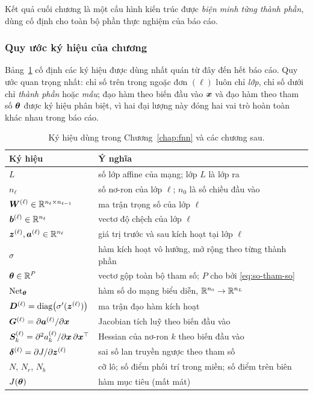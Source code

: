 Kết quả cuối chương là một cấu hình kiến trúc được \emph{biện minh từng thành
phần}, dùng cố định cho toàn bộ phần thực nghiệm của báo cáo.
 
\subsubsection*{Quy ước ký hiệu của chương}
 
Bảng~\ref{tab:ky-hieu} cố định các ký hiệu được dùng nhất quán từ đây đến hết
báo cáo. Quy ước quan trọng nhất: chỉ số trên trong ngoặc đơn $(\ell)$ luôn chỉ
\emph{lớp}, chỉ số dưới chỉ \emph{thành phần} hoặc \emph{mẫu}; đạo hàm theo biến
đầu vào $\bm{x}$ và đạo hàm theo tham số $\bm{\theta}$ được ký hiệu phân biệt, vì hai
đại lượng này đóng hai vai trò hoàn toàn khác nhau trong báo cáo.
 
\begin{table}[H]
\centering
\caption{Ký hiệu dùng trong Chương~\ref{chap:fnn} và các chương sau.}
\label{tab:ky-hieu}
\small
\begin{tabular}{@{}l p{9.4cm}@{}}
\toprule
\textbf{Ký hiệu} & \textbf{Ý nghĩa} \\
\midrule
$L$ & số lớp affine của mạng; lớp $L$ là lớp ra \\
$n_\ell$ & số nơ-ron của lớp $\ell$; $n_0$ là số chiều đầu vào \\
$\bm{W}^{(\ell)} \in \mathbb{R}^{n_\ell \times n_{\ell-1}}$ & ma trận trọng số của lớp
  $\ell$ \\
$\bm{b}^{(\ell)} \in \mathbb{R}^{n_\ell}$ & vectơ độ chệch của lớp $\ell$ \\
$\bm{z}^{(\ell)}, \bm{a}^{(\ell)} \in \mathbb{R}^{n_\ell}$ & giá trị trước và sau kích hoạt
  tại lớp $\ell$ \\
$\sigma$ & hàm kích hoạt vô hướng, mở rộng theo từng thành phần \\
$\bm{\theta} \in \mathbb{R}^{P}$ & vectơ gộp toàn bộ tham số; $P$ cho bởi
  \eqref{eq:so-tham-so} \\
$\operatorname{Net}_{\bm{\theta}}$ & hàm số do mạng biểu diễn, $\mathbb{R}^{n_0}\to\mathbb{R}^{n_L}$ \\
$\bm{D}^{(\ell)} = \operatorname{diag}\!\big(\sigma'(\bm{z}^{(\ell)})\big)$ & ma trận đạo hàm kích
  hoạt \\
$\bm{G}^{(\ell)} = \partial\bm{a}^{(\ell)}/\partial\bm{x}$ & Jacobian tích luỹ theo biến
  đầu vào \\
$\bm{S}^{(\ell)}_k = \partial^2 a^{(\ell)}_k/\partial\bm{x}\,\partial\bm{x}^{\top}$ &
  Hessian của nơ-ron $k$ theo biến đầu vào \\
$\bm{\delta}^{(\ell)} = \partial J/\partial\bm{z}^{(\ell)}$ & sai số lan truyền
  ngược theo tham số \\
$N$, $N_r$, $N_b$ & cỡ lô; số điểm phối trí trong miền; số điểm trên biên \\
$J(\bm{\theta})$ & hàm mục tiêu (mất mát) \\
\bottomrule
\end{tabular}
\end{table}
 
